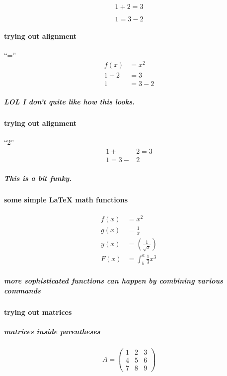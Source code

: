 \documentclass[a4paper, 12pt]{article}
\begin{document}
\begin{equation*}
  1 + 2 = 3 
\end{equation*}

\begin{equation*}
  1 = 3 - 2
\end{equation*}

\paragraph{trying out alignment} ``=''
\begin{align*}
    f(x) &= x^2\\
    1 + 2 &= 3\\
  1 &= 3 - 2
\end{align*}
\subparagraph{LOL I don't quite like how this looks.}

\paragraph{trying out alignment} ``2''
\begin{align*}
    1 + &2 = 3\\
  1 = 3 - &2
\end{align*}
\subparagraph{This is a bit funky.}

\paragraph{some simple LaTeX math functions}
\begin{align*}
  f(x) &= x^2\\
  g(x) &= \frac{1}{x}\\
  y(x) &= \left(\frac{1}{\sqrt{x}}\right)\\
  F(x) &= \int^a_b \frac{1}{3}x^3
\end{align*}
\subparagraph{more sophisticated functions can happen by combining various commands}


\paragraph{trying out matrices}
\subparagraph{matrices inside parentheses}
\begin{equation*}
A = 
\begin{pmatrix}
1 & 2 & 3 \\
4 & 5 & 6 \\
7 & 8 & 9
\end{pmatrix}
\end{equation*}
\end{document}

